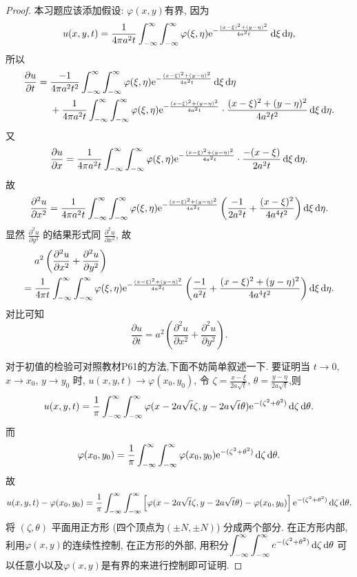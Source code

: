 \begin{proof}
  本习题应该添加假设: $\varphi(x,y)$有界, 因为
  \[u(x,y,t) = \frac{1}{4\pi a^2t}\int_{-\infty}^{\infty}
    \int_{-\infty}^{\infty}\varphi(\xi,\eta)
      \mathrm{e}^{-\frac{(x-\xi)^2+(y-\eta)^2}{4a^2t}}\mathop{}\!\mathrm{d}\xi\mathop{}\!\mathrm{d}\eta,\]
  所以
  \[\begin{split}
    \frac{\partial u}{\partial t}
    ={} & \frac{-1}{4\pi a^2t^2}\int_{-\infty}^{\infty}\int_{-\infty}^{\infty}
      \varphi(\xi,\eta) \mathrm{e}^{-\frac{(x-\xi)^2+(y-\eta)^2}{4a^2t}}\mathop{}\!\mathrm{d}\xi\mathop{}\!\mathrm{d}\eta \\
        & + \frac{1}{4\pi a^2t}\int_{-\infty}^{\infty}\int_{-\infty}^{\infty}
          \varphi(\xi,\eta) \mathrm{e}^{-\frac{(x-\xi)^2+(y-\eta)^2}{4a^2t}}
          \cdot\frac{(x-\xi)^2+(y-\eta)^2}{4a^2t^2}\mathop{}\!\mathrm{d}\xi\mathop{}\!\mathrm{d}\eta.
  \end{split}\]
  又
  \[\frac{\partial u}{\partial x} = 
    \frac{1}{4\pi a^2t}\int_{-\infty}^{\infty}\int_{-\infty}^{\infty}
    \varphi(\xi,\eta) \mathrm{e}^{-\frac{(x-\xi)^2+(y-\eta)^2}{4a^2t}}
    \cdot\frac{-(x-\xi)}{2a^2t}\mathop{}\!\mathrm{d}\xi\mathop{}\!\mathrm{d}\eta.\]
  故
  \[\frac{\partial^2u}{\partial x^2} =
    \frac{1}{4\pi a^2t}\int_{-\infty}^{\infty}\int_{-\infty}^{\infty}
    \varphi(\xi,\eta) \mathrm{e}^{-\frac{(x-\xi)^2+(y-\eta)^2}{4a^2t}}
    \left(\frac{-1}{2a^2t} + \frac{(x-\xi)^2}{4a^4t^2}\right) \mathop{}\!\mathrm{d}\xi\mathop{}\!\mathrm{d}\eta.\]
  显然 $\displaystyle\frac{\partial^2u}{\partial y^2}$ 的结果形式同 $\displaystyle\frac{\partial^2u}{\partial x^2}$, 故
  \begin{align*}
    & a^2\left(\frac{\partial^2u}{\partial x^2}+\frac{\partial^2u}{\partial y^2}\right) \\
    ={} & \frac{1}{4\pi t}\int_{-\infty}^{\infty}\int_{-\infty}^{\infty}
          \varphi(\xi,\eta) \mathrm{e}^{-\frac{(x-\xi)^2+(y-\eta)^2}{4a^2t}}
          \left(\frac{-1}{a^2t}+\frac{(x-\xi)^2+(y-\eta)^2}{4a^4t^2}\right)\mathop{}\!\mathrm{d}\xi\mathop{}\!\mathrm{d}\eta.
  \end{align*}
  对比可知
  \[\frac{\partial u}{\partial t}
    = a^2\left(\frac{\partial^2u}{\partial x^2}+\frac{\partial^2u}{\partial y^2}\right).\]
  
  对于初值的检验可对照教材P61的方法,下面不妨简单叙述一下.
  要证明当 $t\to 0$, $x\to x_0$, $y\to y_0$ 时,
  $u(x,y,t)\to\varphi(x_0,y_0)$, 令 $\displaystyle\zeta=\frac{x-\xi}{2a\sqrt{t}}$,
  $\displaystyle\theta=\frac{y-\eta}{2a\sqrt{t}}$,则
  \[u(x,y,t) =
    \frac{1}{\pi}\int_{-\infty}^{\infty}\int_{-\infty}^{\infty}
    \varphi(x-2a\sqrt{t}\zeta,y-2a\sqrt{t}\theta) \mathrm{e}^{-(\zeta^2+\theta^2)}
    \mathop{}\!\mathrm{d}\zeta\mathop{}\!\mathrm{d}\theta.\]
  而
  \[\varphi(x_0,y_0) =
    \frac{1}{\pi}\int_{-\infty}^{\infty}\int_{-\infty}^{\infty}
    \varphi(x_0,y_0) \mathrm{e}^{-(\zeta^2+\theta^2)} \mathop{}\!\mathrm{d}\zeta\mathop{}\!\mathrm{d}\theta.\]
  故
  \[u(x,y,t) - \varphi(x_0,y_0) =
    \frac{1}{\pi} \int_{-\infty}^{\infty}\int_{-\infty}^{\infty}
    \left[\varphi(x-2a\sqrt{t}\zeta,y-2a\sqrt{t}\theta)-\varphi(x_0,y_0)\right]
    \mathrm{e}^{-(\zeta^2+\theta^2)}\mathop{}\!\mathrm{d}\zeta\mathop{}\!\mathrm{d}\theta.\]
  将 $(\zeta,\theta)$ 平面用正方形 (四个顶点为$(\pm N,\pm N)$) 分成两个部分.
  在正方形内部, 利用$\varphi(x,y)$的连续性控制, 在正方形的外部,
  用积分$\displaystyle\int_{-\infty}^{\infty}\int_{-\infty}^{\infty}e^{-(\zeta^2+\theta^2)}\mathop{}\!\mathrm{d}\zeta\mathop{}\!\mathrm{d}\theta$ 可以任意小以及$\varphi(x,y)$是有界的来进行控制即可证明.
\end{proof}


